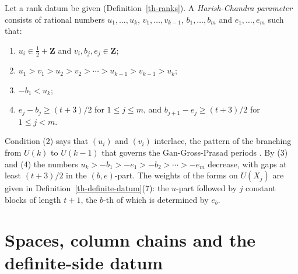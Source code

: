 \begin{definition}\label{th-hc-parameter}
Let a rank datum be given (Definition~\ref{th-ranks}). A
\emph{Harish-Chandra parameter} consists of rational numbers
$u_1,\ldots,u_k$, $v_1,\ldots,v_{k-1}$, $b_1,\ldots,b_m$ and
$e_1,\ldots,e_m$ such that:
\begin{enumerate}
\item $u_i\in\tfrac12+\mathbf Z$ and $v_i,b_j,e_j\in\mathbf Z$;
\item $u_1>v_1>u_2>v_2>\cdots>u_{k-1}>v_{k-1}>u_k$;
\item $-b_1<u_k$;
\item $e_j-b_j\geq(t+3)/2$ for $1\leq j\leq m$, and
  $b_{j+1}-e_j\geq(t+3)/2$ for $1\leq j<m$.
\end{enumerate}
\end{definition}

Condition (2) says that $(u_i)$ and $(v_i)$ interlace, the pattern of the
branching from $U(k)$ to $U(k-1)$ that governs the Gan-Gross-Prasad periods
\cite{GGP12}. By (3) and (4) the numbers
$u_k>-b_1>-e_1>-b_2>\cdots>-e_m$ decrease, with gaps at least $(t+3)/2$ in
the $(b,e)$-part. The weights of the forms on $U(X_j)$ are given in
Definition~\ref{th-definite-datum}(7): the $u$-part followed by $j$ constant
blocks of length $t+1$, the $b$-th of which is determined by $e_b$.

\section{Spaces, column chains and the definite-side datum}\label{section-th-datum}

